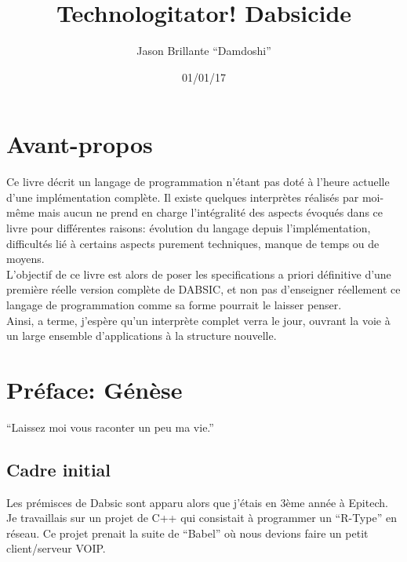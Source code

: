 \documentclass[a5paper, 12pt]{book}
\title{Technologitator! Dabsicide}
\author{Jason Brillante ``Damdoshi''} %
\date{01/01/17}
\begin{document}
\maketitle



\frontmatter
\chapter{Avant-propos}

Ce livre décrit un langage de programmation n'étant pas doté
à l'heure actuelle d'une implémentation complète. Il existe
quelques interprètes réalisés par moi-même mais aucun ne prend
en charge l'intégralité des aspects évoqués dans ce livre
pour différentes raisons: évolution du langage depuis
l'implémentation, difficultés lié à certains aspects purement
techniques, manque de temps ou de moyens.\\

L'objectif de ce livre est alors de poser les specifications
a priori définitive d'une première réelle version complète
de DABSIC, et non pas d'enseigner réellement ce langage de
programmation comme sa forme pourrait le laisser penser.\\

Ainsi, a terme, j'espère qu'un interprète complet verra le
jour, ouvrant la voie à un large ensemble d'applications à
la structure nouvelle.


\chapter{Préface: Génèse}

``Laissez moi vous raconter un peu ma vie.''

\section{Cadre initial}

Les prémisces de Dabsic sont apparu alors que j'étais en
3ème année à Epitech. Je travaillais sur un projet de C++
qui consistait à programmer un ``R-Type'' en réseau.
Ce projet prenait la suite de ``Babel'' o\`u
nous devions faire un petit client/serveur VOIP.\\
\end{document}

